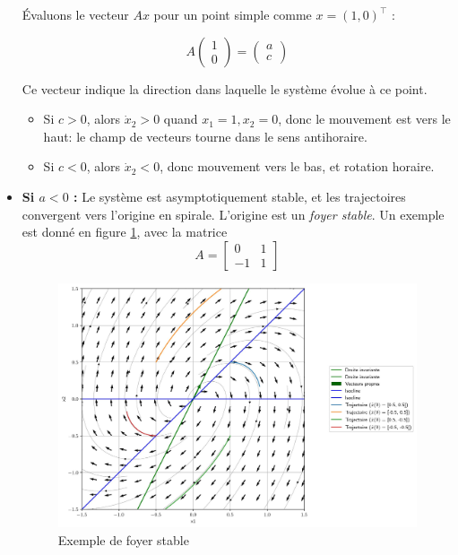 \begin{itemize}
                Évaluons le vecteur $A x$ pour un point simple comme $x = (1, 0)^\top$ :
                
                \begin{equation}
                A \begin{pmatrix}1\\0\end{pmatrix} = \begin{pmatrix}a\\c\end{pmatrix}
                \end{equation}
                
                Ce vecteur indique la direction dans laquelle le système évolue à ce point.
                
                \begin{itemize}
                    \item Si $c > 0$, alors $\dot{x}_2 > 0$ quand $x_1 = 1, x_2 = 0$, donc le mouvement est vers le haut: le champ de vecteurs tourne dans le sens antihoraire.
                    \item Si $c < 0$, alors $\dot{x}_2 < 0$, donc mouvement vers le bas, et rotation horaire.
                \end{itemize}
                
                \item \textbf{Si $a < 0$ :} Le système est asymptotiquement stable, et les trajectoires convergent vers l'origine en spirale. L'origine est un \textit{foyer stable}. Un exemple est donné en figure \ref{fig:foyer_stable}, avec la matrice
                \begin{equation}
                    A = \begin{bmatrix} 0 & 1 \\ -1 & 1 \end{bmatrix}
                \end{equation}
                \begin{figure}[ht!]
                    \centering
                    \includegraphics[width=\textwidth]{images/foyer_stable.jpg}
                    \caption{Exemple de foyer stable}
                    \label{fig:foyer_stable}
                \end{figure}
                

\end{itemize}
